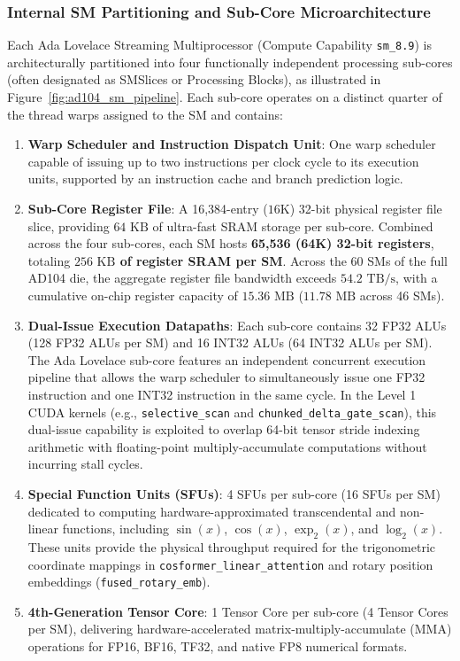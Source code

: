 \subsubsection{Internal SM Partitioning and Sub-Core Microarchitecture}
\label{sec:appendix_ada_sm_partitioning}

Each Ada Lovelace Streaming Multiprocessor (Compute Capability \texttt{sm\_8.9}) is architecturally partitioned into four functionally independent processing sub-cores (often designated as SMSlices or Processing Blocks), as illustrated in Figure~\ref{fig:ad104_sm_pipeline}. Each sub-core operates on a distinct quarter of the thread warps assigned to the SM and contains:
\begin{enumerate}
    \item \textbf{Warp Scheduler and Instruction Dispatch Unit}: One warp scheduler capable of issuing up to two instructions per clock cycle to its execution units, supported by an instruction cache and branch prediction logic.
    \item \textbf{Sub-Core Register File}: A 16,384-entry ($16\text{K}$) 32-bit physical register file slice, providing $64\text{ KB}$ of ultra-fast SRAM storage per sub-core. Combined across the four sub-cores, each SM hosts \textbf{65,536 (64K) 32-bit registers}, totaling \textbf{$256\text{ KB}$ of register SRAM per SM}. Across the 60 SMs of the full AD104 die, the aggregate register file bandwidth exceeds $54.2\text{ TB/s}$, with a cumulative on-chip register capacity of \textbf{$15.36\text{ MB}$} ($11.78\text{ MB}$ across 46 SMs).
    \item \textbf{Dual-Issue Execution Datapaths}: Each sub-core contains 32 FP32 ALUs (128 FP32 ALUs per SM) and 16 INT32 ALUs (64 INT32 ALUs per SM). The Ada Lovelace sub-core features an independent concurrent execution pipeline that allows the warp scheduler to simultaneously issue one FP32 instruction and one INT32 instruction in the same cycle. In the \neuralops{} Level 1 CUDA kernels (e.g., \texttt{selective\_scan} and \texttt{chunked\_delta\_gate\_scan}), this dual-issue capability is exploited to overlap 64-bit tensor stride indexing arithmetic with floating-point multiply-accumulate computations without incurring stall cycles.
    \item \textbf{Special Function Units (SFUs)}: 4 SFUs per sub-core (16 SFUs per SM) dedicated to computing hardware-approximated transcendental and non-linear functions, including $\sin(x)$, $\cos(x)$, $\exp_2(x)$, and $\log_2(x)$. These units provide the physical throughput required for the trigonometric coordinate mappings in \texttt{cosformer\_linear\_attention} and rotary position embeddings (\texttt{fused\_rotary\_emb}).
    \item \textbf{4th-Generation Tensor Core}: 1 Tensor Core per sub-core (4 Tensor Cores per SM), delivering hardware-accelerated matrix-multiply-accumulate (MMA) operations for FP16, BF16, TF32, and native FP8 numerical formats.
\end{enumerate}

